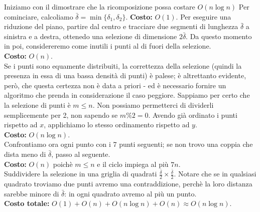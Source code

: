 Iniziamo con il dimostrare che la ricomposizione possa costare $ O(n\log{n}) $
Per cominciare, calcoliamo $ \bar{\delta} = \min\{\delta_1, \delta_2\}$.
\textbf{Costo:} $ O(1) $.
Per eseguire una riduzione del piano, partire dal centro e tracciare due segmenti di lunghezza $ \bar{\delta} $ a sinistra e a destra, ottenedo una selezione di dimensione $ 2\bar{\delta} $. Da questo momento in poi, considereremo come inutili i punti al di fuori della selezione.\\
\textbf{Costo:} $ O(n) $.\\
Se i punti sono equamente distribuiti, la correttezza della selezione (quindi la presenza in essa di una bassa densità di punti) è palese; è altrettanto evidente, però, che questa certezza non è data a priori - ed è necessario fornire un algoritmo che prenda in considerazione il caso peggiore.%
Sappiamo per certo che la selezione di punti è $ m \le n $. Non possiamo permetterci di dividerli semplicemente per 2, non sapendo se $ m \% 2 = 0 $.
Avendo già ordinato i punti rispetto ad $ x $, applichiamo lo stesso ordinamento rispetto ad $ y $.\\
\textbf{Costo:} $ O(n \log{n}) $.\\
Confrontiamo ora ogni punto con i 7 punti seguenti; se non trovo una coppia che dista meno di $ \bar{\delta} $, passo al seguente.\\
\textbf{Costo: } $ O(n) $ poichè $ m \le n $ e il ciclo impiega al più $ 7n $.\\
Suddividere la selezione in una griglia di quadrati $ \frac{\bar{\delta}}{2} \times \frac{\bar{\delta}}{2}$. Notare che se in qualsiasi quadrato troviamo due punti avremo una contraddizione, perchè la loro distanza sarebbe minore di $ \bar{\delta} $: in ogni quadrato avremo al più un punto.\\ %
\textbf{Costo totale:} $ O(1) + O(n) + O(n \log{n}) + O(n) \approx O(n \log{n})$. %
